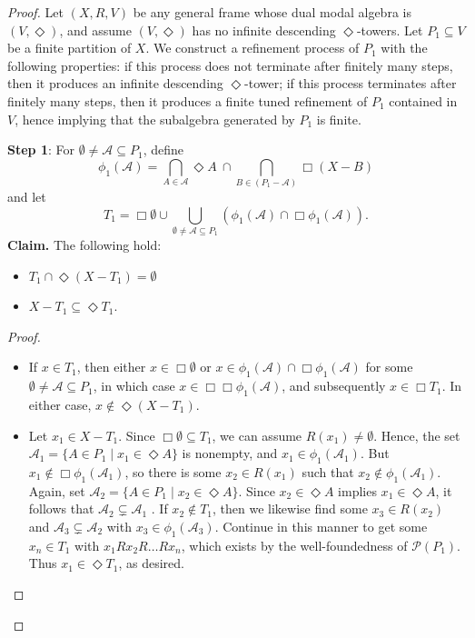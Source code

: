 \documentclass[submission]{eptcs}
\begin{document}
\begin{proof}
    Let $(X,R,V)$ be any general frame whose dual modal algebra is $(V,\Diamond)$, and assume $(V,\Diamond)$ has no infinite descending $\Diamond$-towers. 
    Let $P_1 \subseteq V$ be a finite partition of $X$.
    We construct a refinement process of $P_1$ with the following properties: if this process does not terminate after finitely many steps, then it produces an infinite descending $\Diamond$-tower; if this process terminates after finitely many steps, then it produces a finite tuned refinement of $P_1$ contained in $V$, hence implying that the subalgebra generated by $P_1$ is finite.
    \par \textbf{Step 1}:
    For $\emptyset\neq\mathcal{A}\subseteq P_1$, define
    \[
    \phi_1 (\mathcal{A})= 
    \bigcap_{A \in \mathcal{A}} \Diamond A \ \cap
    \bigcap_{B \in (P_1-\mathcal{A})}\Box (X-B)
    \]
    and let
    \[
    T_1=\Box\emptyset \cup\bigcup_{\emptyset \neq\mathcal{A}\subseteq P_1}(\phi_1(\mathcal{A}) \cap \Box\phi_1(\mathcal{A})).
    \]
    \textbf{Claim.} The following hold:
    \begin{itemize}
    \item [(i)] $T_1 \cap \Diamond(X-T_1)=\emptyset$
    \item [(ii)] $X-T_1 \subseteq \Diamond T_1$.
    \end{itemize}

    \begin{proof}
    \begin{itemize}
    
  \item[(i)] If $x\in T_1$, then either $x \in \Box \emptyset$ or $x \in \phi_1(\mathcal{A}) \cap \Box\phi_1(\mathcal{A})$ for some $\emptyset\neq\mathcal{A}\subseteq P_1$, in which case
  $x \in \Box\Box\phi_1(\mathcal{A})$, and subsequently $x \in \Box T_1$.
    In either case, $x \notin \Diamond(X-T_1)$.
    
  \item[(ii)] Let $x_1 \in X-T_1$. Since $\Box \emptyset \subseteq T_1$, we can assume $R(x_1)\neq \emptyset$.
    Hence, the set $\mathcal{A}_1 = \{A \in P_1 \mid x_1 \in \Diamond A \}$ is nonempty, and $x_1 \in \phi_1(\mathcal{A}_1)$.
    But $x_1 \notin \Box \phi_1(\mathcal{A}_1)$, so there is some $x_2 \in R(x_1)$ such that $x_2 \notin \phi_1(\mathcal{A}_1)$.
    Again, set $\mathcal{A}_2=\{A \in P_1\mid x_2 \in \Diamond A\}$.
    Since $x_2 \in \Diamond A$ implies $x_1 \in \Diamond A$, it follows that
    $\mathcal{A}_2\subsetneq \mathcal{A}_1$ .
    If $x_2 \notin T_1$, then we likewise find some $x_3 \in R(x_2)$ and $\mathcal{A}_3\subsetneq \mathcal{A}_2$ with $x_3 \in \phi_1(\mathcal{A}_3)$. 
    Continue in this manner to get some $x_n \in T_1$ with 
    $x_1Rx_2R\dots Rx_n$, which exists by the well-foundedness of $\mathcal{P}(P_1)$. Thus $x_1 \in \Diamond T_1$, as desired.
    \end{itemize}


\end{proof}
\end{proof}
\end{document}
